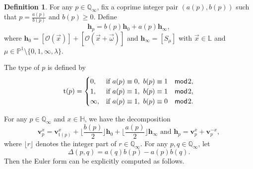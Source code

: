 \documentclass[11pt,a4paper,reqno]{amsart}%
\theoremstyle{plain}
\theoremstyle{definition}
\newtheorem{definition}[definition]{Definition}
\numberwithin{equation}{section}
\numberwithin{equation}{section}
\newcommand{\QQi}{\mathbb{Q}_\infty}
\newcommand{\vx}{\vec{x}}
\renewcommand{\mod}{\mathsf{mod}\hspace{.01in}}
\newcommand{\bv}{\mathbf{v}}
\newcommand{\typ}[1]{\mathrm{t}(#1)}%
\newcommand{\bfH}{\mathbb{H}}
\newcommand{\bfh}{\mathbf{h}}
\begin{document}
\begin{definition}%
     For  any $p \in \QQi$,   fix a coprime  integer pair $(a(p), b(p)) $ 
such that $p =\frac{a(p)}{b(p)}$ and $b(p)\geq 0$. 
Define
\[
\bfh_{p}=b(p)\bfh_0+a(p)\bfh_{\infty},
\]
     where $\mathbf{h}_0=[\mathcal{O}(\vx)]+[\mathcal{O}(\vx+\vec{\omega})]$  and $\mathbf{h}_{\infty}=[S_{\mu}]$  with $\vx\in \mathbb{L}$ and $\mu\in\mathbb{P}^1\setminus\{0,1,\infty,\lambda\}$.
     
The   type of $p$ is  defined by
$$\typ{p}= 
\begin{cases}
0, & \text{if } a(p) \equiv 0,\ b(p) \equiv 1  \quad \mod 2, \\
1, & \text{if } a(p) \equiv 1,\ b(p) \equiv 1 \quad  \mod 2, \\
\infty, & \text{if } a(p) \equiv 1,\ b(p) \equiv 0 \quad \mod 2.
\end{cases}
$$  
\end{definition} 

For any $p\in\QQi$ and $x\in\bfH$,  we have the decomposition
\[
\bv_{p}^{x}=\bv_{\typ{p}}^{x} +\lfloor\frac{b(p)}{2}\rfloor \mathbf{h}_0+\lfloor\frac{a(p)}{2}\rfloor \mathbf{h}_{\infty} \text{ and }\bfh_p=\bv_{p}^{x}+\bv_{p}^{-x},
\]
where $\lfloor r \rfloor$ denotes the integer part of $r\in \QQi $.
For any $ p, q \in \QQi$, let
$$\Delta(p,q)
=a(q)b(p)-a(p)b(q).$$ 
Then the Euler form can be explicitly computed as follows.
  
\end{document}
